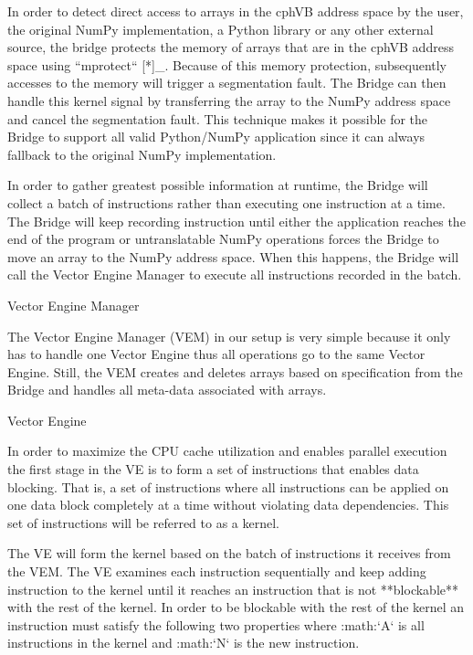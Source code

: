 In order to detect direct access to arrays in the cphVB address space by the user, the original NumPy implementation, a Python library or any other external source, the bridge protects the memory of arrays that are in the cphVB address space using ``mprotect`` [*]_. Because of this memory protection, subsequently accesses to the memory will trigger a segmentation fault. The Bridge can then handle this kernel signal by transferring the array to the NumPy address space and cancel the segmentation fault. This technique makes it possible for the Bridge to support all valid Python/NumPy application since it can always fallback to the original NumPy implementation.

In order to gather greatest possible information at runtime, the Bridge will collect a batch of instructions rather than executing one instruction at a time. The Bridge will keep recording instruction until either the application reaches the end of the program or untranslatable NumPy operations forces the Bridge to move an array to the NumPy address space. When this happens, the Bridge will call the Vector Engine Manager to execute all instructions recorded in the batch.

Vector Engine Manager
~~~~~~~~~~~~~~~~~~~~~

The Vector Engine Manager (VEM) in our setup is very simple because it only has to handle one Vector Engine thus all operations go to the same Vector Engine. Still, the VEM creates and deletes arrays based on specification from the Bridge and handles all meta-data associated with arrays. 

Vector Engine
~~~~~~~~~~~~~

In order to maximize the CPU cache utilization and enables parallel execution the first stage in the VE is to form a set of instructions that enables data blocking. That is, a set of instructions where all instructions can be applied on one data block completely at a time without violating data dependencies. This set of instructions will be referred to as a kernel.

The VE will form the kernel based on the batch of instructions it receives from the VEM. The VE examines each instruction sequentially and keep adding instruction to the kernel until it reaches an instruction that is not **blockable** with the rest of the kernel. In order to be blockable with the rest of the kernel an instruction must satisfy the following two properties where :math:`A` is all instructions in the kernel and :math:`N` is the new instruction.

